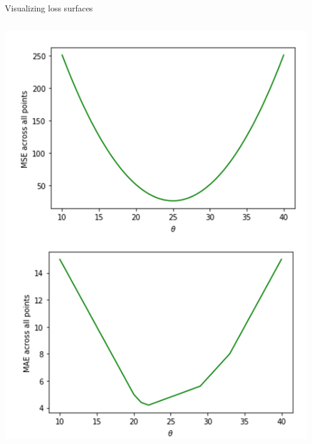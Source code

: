 \documentclass[aspectratio=169]{../latex_main/tntbeamer}  %
\begin{document}
\begin{frame}{Visualizing loss surfaces}
\begin{columns}
\begin{column}{.45\textwidth}
                        \centering
	                   \includegraphics[scale=.3]{Bild5}

	        \end{column}
	    \end{columns}
	\end{frame}
	
\end{document}
